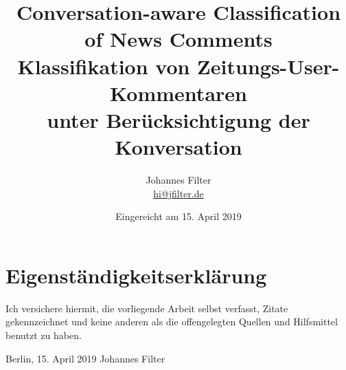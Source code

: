 \documentclass[
        a4paper,     %
        titlepage,   %
        twoside,     %
        parskip      %
        ]{scrbook} %
\title{Conversation-aware Classification\\of News Comments
\\ \bigskip
\large{Klassifikation von Zeitungs-User-Kommentaren\\unter Ber\"ucksichtigung der Konversation}}
\author{Johannes Filter\\{\small{\href{mailto:hi@jfilter.de}{hi@jfilter.de}}}}
\date{Eingereicht am 15. April 2019}
\begin{document}
\maketitle    %

\cleardoublepage %




\tableofcontents

\cleardoublepage %

















\clearpage


%


\clearpage




\clearpage


\chapter*{Eigenst\"andigkeitserkl\"arung}

Ich versichere hiermit, die vorliegende Arbeit selbst verfasst, Zitate gekennzeichnet und keine anderen als die offengelegten Quellen und Hilfsmittel benutzt zu haben.

\vspace{3cm} 

Berlin, 15. April 2019 \hfill Johannes Filter
\end{document}
